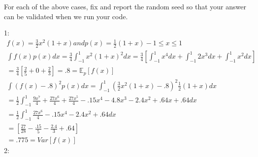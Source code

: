 \documentclass[12pt]{article}
\begin{document}
For each of the above cases, fix and report the random seed so that your answer can be validated when we run your code.
\begin{solution}
1: \begin{align*}
f(x) = \frac{3}{2}x^{2}(1+x) and 
p(x) = \frac{1}{2}(1+x) -1\leq x \leq 1 \\
\int f(x)p(x) dx = \frac{3}{4} \int_{-1}^{1} x^{2}(1+x)^{2}dx = \frac{3}{4}\left[\int_{-1}^{1} x^{4} dx + \int_{-1}^{1} 2x^{3} dx + \int_{-1}^{1} x^{2} dx \right] \\
= \frac{3}{4}\left[ \frac{2}{5} + 0+\frac{2}{3}\right] = .8 = \mathbb{E}_p[f(x)]\\
\int (f(x)-.8)^{2}p(x) dx = \int_{-1}^{1} (\frac{3}{2}x^{2}(1+x) -.8)^2\frac{1}{2}(1+x) dx \\
= \frac{1}{2} \int_{-1}^{1} \frac{9x^{7}}{4} + \frac{27x^{6}}{4} +\frac{27x^{5}}{4} -.15x^{4} - 4.8x^{3} - 2.4x^{2} + .64x + .64 dx \\ 
= \frac{1}{2} \int_{-1}^{1} \frac{27x^{6}}{4}  -.15x^{4} - 2.4x^{2} + .64 dx \\
= \left[\frac{27}{28} - \frac{.15}{5} - \frac{2.4}{3} + .64 \right] \\ 
= .775 = Var[f(x)]
\end{align*}
2:
\end{solution}
\end{document}
